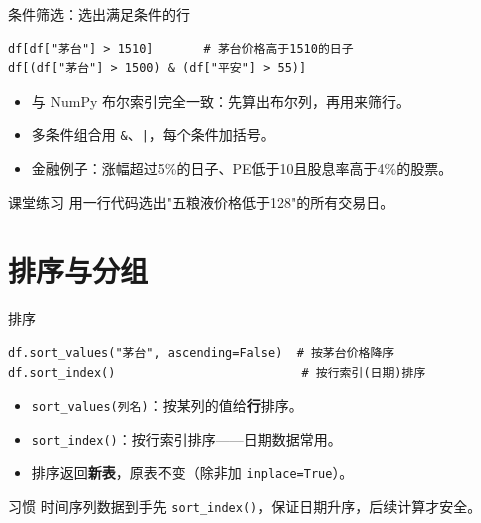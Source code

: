 \documentclass[9pt]{ctexbeamer}
\begin{document}
\begin{frame}[fragile]{条件筛选：选出满足条件的行}
	\begin{lstlisting}
df[df["茅台"] > 1510]       # 茅台价格高于1510的日子
df[(df["茅台"] > 1500) & (df["平安"] > 55)]
\end{lstlisting}
	\begin{itemize}
		\item 与 NumPy 布尔索引完全一致：先算出布尔列，再用来筛行。
		\item 多条件组合用 \texttt{\&}、\texttt{|}，每个条件加括号。
		\item 金融例子：涨幅超过5\%的日子、PE低于10且股息率高于4\%的股票。
	\end{itemize}
	\begin{exampleblock}{课堂练习}
		用一行代码选出"五粮液价格低于128"的所有交易日。
	\end{exampleblock}
\end{frame}


\section{排序与分组}

\begin{frame}[fragile]{排序}
	\begin{lstlisting}
df.sort_values("茅台", ascending=False)  # 按茅台价格降序
df.sort_index()                          # 按行索引(日期)排序
\end{lstlisting}
	\begin{itemize}
		\item \texttt{sort\_values(列名)}：按某列的值给\textbf{行}排序。
		\item \texttt{sort\_index()}：按行索引排序——日期数据常用。
		\item 排序返回\textbf{新表}，原表不变（除非加 \texttt{inplace=True}）。
	\end{itemize}
	\begin{alertblock}{习惯}
		时间序列数据到手先 \texttt{sort\_index()}，保证日期升序，后续计算才安全。
	\end{alertblock}
\end{frame}
\end{document}
